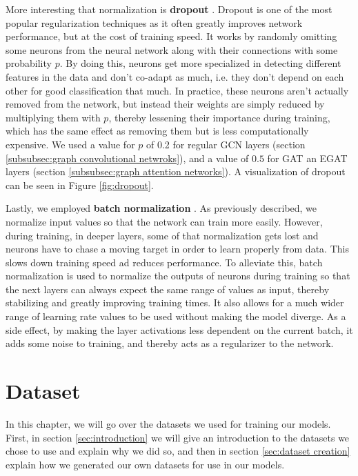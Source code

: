 \documentclass[times, utf8, diplomski, english]{fer_eng}
\begin{document}
More interesting that normalization is \textbf{dropout} \cite{dropout} \cite{dropout2}. Dropout is one of the most popular regularization techniques as it often greatly improves network performance, but at the cost of training speed. It works by randomly omitting some neurons from the neural network along with their connections with some probability $p$. By doing this, neurons get more specialized in detecting different features in the data and don't co-adapt as much, i.e. they don't depend on each other for good classification that much. In practice, these neurons aren't actually removed from the network, but instead their weights are simply reduced by multiplying them with $p$, thereby lessening their importance during training, which has the same effect as removing them but is less computationally expensive. We used a value for $p$ of 0.2 for regular GCN layers (section \ref{subsubsec:graph convolutional netwroks}), and a value of $0.5$ for GAT an EGAT layers (section \ref{subsubsec:graph attention networks}). A visualization of dropout can be seen in Figure \ref{fig:dropout}.

Lastly, we employed \textbf{batch normalization} \cite{bn}. As previously described, we normalize input values so that the network can train more easily. However, during training, in deeper layers, some of that normalization gets lost and neurons have to chase a moving target in order to learn properly from data. This slows down training speed ad reduces performance. To alleviate this, batch normalization is used to normalize the outputs of neurons during training so that the next layers can always expect the same range of values as input, thereby stabilizing and greatly improving training times. It also allows for a much wider range of learning rate values to be used without making the model diverge. As a side effect, by making the layer activations less dependent on the current batch, it adds some noise to training, and thereby acts as a regularizer to the network.

\chapter{Dataset}
\label{ch:dataset}

In this chapter, we will go over the datasets we used for training our models. First, in section \ref{sec:introduction} we will give an introduction to the datasets we chose to use and explain why we did so, and then in section \ref{sec:dataset creation} explain how we generated our own datasets for use in our models.
\end{document}
